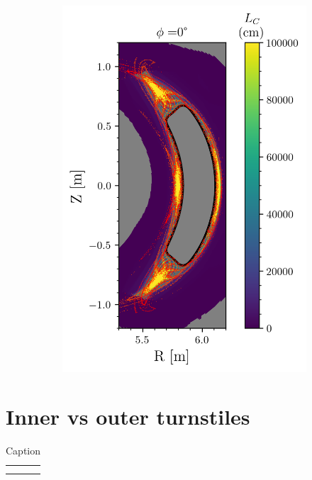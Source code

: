 \begin{figure}[H]
\begin{minipage}{0.45\textwidth}
\begin{subfigure}[b]{0.99\textwidth}
            \caption{}
            \label{fig:}
        \end{subfigure}
    \end{minipage}%
    \begin{minipage}{0.5\textwidth} %
        \centering
        \begin{subfigure}[b]{\textwidth}
            \centering
            \includegraphics[width=\textwidth]{images/w7x-gym00-1750/gym00_1750_connlength.png}
            \caption{}
            \label{fig:}
        \end{subfigure}
    \end{minipage}
    \caption{}
    \label{fig:}
\end{figure}


\section{Inner vs outer turnstiles}

\begin{table}[]
    \centering
    \begin{tabular}{c|c}
         &  \\
         & 
    \end{tabular}
    \caption{Caption}
    \label{tab:my_label}
\end{table}